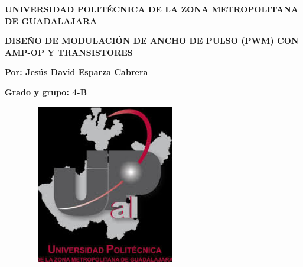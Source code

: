 \documentclass[12pt]{article}
\begin{document}
\setlength{\parskip}{14.04pt}
{\fontsize{14pt}{16.8pt}\selectfont \textbf{UNIVERSIDAD POLITÉCNICA DE LA ZONA METROPOLITANA DE GUADALAJARA}\par}\par

{\fontsize{14pt}{16.8pt}\selectfont \textbf{\textcolor[HTML]{21409A}{DISEÑO DE MODULACIÓN DE ANCHO DE PULSO (PWM) CON AMP-OP Y TRANSISTORES}}\par}\par

{\fontsize{14pt}{16.8pt}\selectfont \textbf{Por: Jesús David Esparza Cabrera}\par}\par

{\fontsize{14pt}{16.8pt}\selectfont \textbf{Grado y grupo: 4-B}\par}\par




\begin{figure}[H]
	\begin{Center}
		\includegraphics[width=2.71in,height=2.74in]{./media/image1.png}
	\end{Center}
\end{figure}



\par


\vspace{\baselineskip}

\vspace{\baselineskip}

\vspace{\baselineskip}
\end{document}
